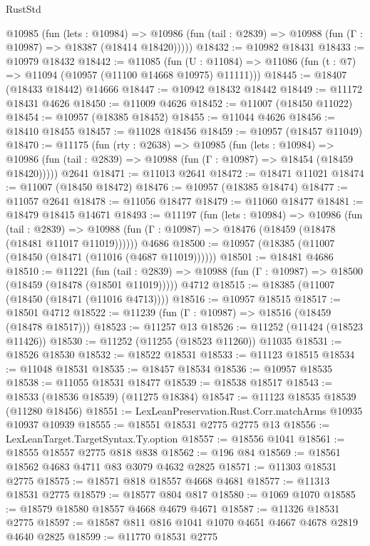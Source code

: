 \begin{lexlean}{RustStd}
\begin{coremodule}
{\begin{coremodule}
{{{{{{{{{{{{{{{{{{{{{{{{{{{{{{{{{    @10985
      (fun (lets : @10984) =>
      @10986 (fun (tail : @2839) => @10988 (fun (Γ : @10987) => @18387 (@18414 @18420)))))
@18432 := @10982 @18431
@18433 := @10979 @18432
@18442 := @11085
    (fun (U : @11084) => @11086 (fun (t : @7) => @11094 (@10957 (@11100 @14668 @10975) @11111)))
@18445 := @18407 (@18433 @18442) @14666
@18447 := @10942 @18432 @18442
@18449 := @11172 @18431 @4626
@18450 := @11009 @4626
@18452 := @11007 (@18450 @11022)
@18454 := @10957 (@18385 @18452)
@18455 := @11044 @4626
@18456 := @18410 @18455
@18457 := @11028 @18456
@18459 := @10957 (@18457 @11049)
@18470 := @11175
    (fun (rty : @2638) =>
    @10985
      (fun (lets : @10984) =>
      @10986 (fun (tail : @2839) => @10988 (fun (Γ : @10987) => @18454 (@18459 @18420)))))
    @2641
@18471 := @11013 @2641
@18472 := @18471 @11021
@18474 := @11007 (@18450 @18472)
@18476 := @10957 (@18385 @18474)
@18477 := @11057 @2641
@18478 := @11056 @18477
@18479 := @11060 @18477
@18481 := @18479 @18415 @14671
@18493 := @11197
    (fun (lets : @10984) =>
    @10986
      (fun (tail : @2839) =>
      @10988 (fun (Γ : @10987) => @18476 (@18459 (@18478 (@18481 @11017 @11019))))))
    @4686
@18500 := @10957 (@18385 (@11007 (@18450 (@18471 (@11016 (@4687 @11019))))))
@18501 := @18481 @4686
@18510 := @11221
    (fun (tail : @2839) => @10988 (fun (Γ : @10987) => @18500 (@18459 (@18478 (@18501 @11019)))))
    @4712
@18515 := @18385 (@11007 (@18450 (@18471 (@11016 @4713))))
@18516 := @10957 @18515
@18517 := @18501 @4712
@18522 := @11239 (fun (Γ : @10987) => @18516 (@18459 (@18478 @18517)))
@18523 := @11257 @13
@18526 := @11252 (@11424 (@18523 @11426))
@18530 := @11252 (@11255 (@18523 @11260)) @11035
@18531 := @18526 @18530
@18532 := @18522 @18531
@18533 := @11123 @18515
@18534 := @11048 @18531
@18535 := @18457 @18534
@18536 := @10957 @18535
@18538 := @11055 @18531 @18477
@18539 := @18538 @18517
@18543 := @18533 (@18536 @18539) (@11275 @18384)
@18547 := @11123 @18535 @18539 (@11280 @18456)
@18551 := LexLeanPreservation.Rust.Corr.matchArms @10935 @10937 @10939
@18555 := @18551 @18531 @2775 @2775 @13
@18556 := LexLeanTarget.TargetSyntax.Ty.option
@18557 := @18556 @1041
@18561 := @18555 @18557 @2775 @818 @838
@18562 := @196 @84
@18569 := @18561 @18562 @4683 @4711 @83 @3079 @4632 @2825
@18571 := @11303 @18531 @2775
@18575 := @18571 @818 @18557 @4668 @4681
@18577 := @11313 @18531 @2775
@18579 := @18577 @804 @817
@18580 := @1069 @1070
@18585 := @18579 @18580 @18557 @4668 @4679 @4671
@18587 := @11326 @18531 @2775
@18597 := @18587 @811 @816 @1041 @1070 @4651 @4667 @4678 @2819 @4640 @2825
@18599 := @11770 @18531 @2775
}}}}}}}}}}}}}}}}}}}}}}}}}}}}}}}}}
\end{coremodule}}
\end{coremodule}
\end{lexlean}
